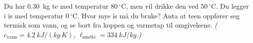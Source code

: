 %
Du har \SI{0.30}{\kilo\gram} te med temperatur $80\,^\circ$C, men vil drikke den ved $50\,^\circ$C. Du legger i is med temperatur $0\,^\circ$C. Hvor mye is må du bruke? Anta at teen oppfører seg termisk som vann, og se bort fra koppen og varmetap til omgivelsene.
\textit{($c_\text{vann} = \SI{4.2}{kJ/(kg\,K)}$, $\ell_\text{smelte} = \SI{334}{kJ/kg}$.)}
%
